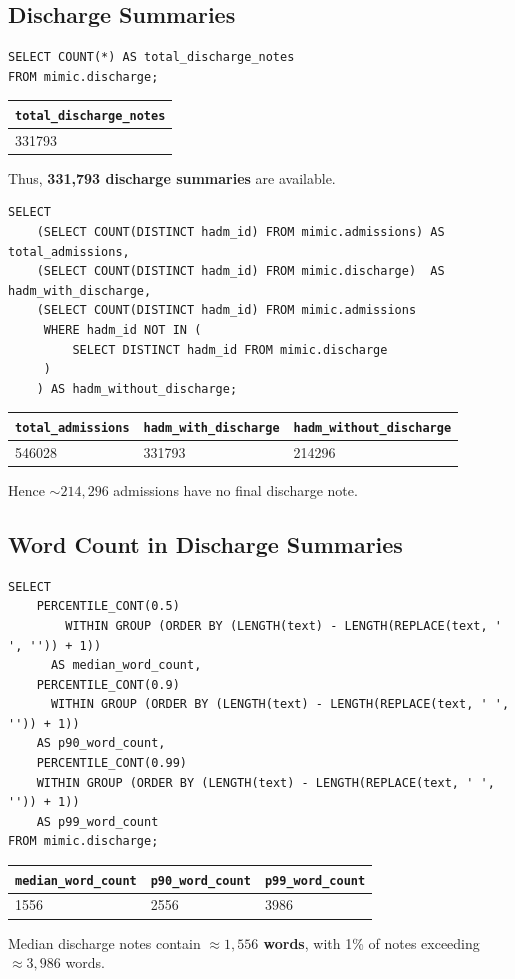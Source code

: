 \documentclass[12pt,a4paper]{report}
\begin{document}
\subsection{Discharge Summaries}
\begin{verbatim}
SELECT COUNT(*) AS total_discharge_notes
FROM mimic.discharge;
\end{verbatim}
\begin{center}
\begin{tabular}{l}
\hline
\texttt{total\_discharge\_notes} \\
\hline
331793 \\
\hline
\end{tabular}
\end{center}
Thus, \textbf{331,793 discharge summaries} are available.

\begin{verbatim}
SELECT
    (SELECT COUNT(DISTINCT hadm_id) FROM mimic.admissions) AS total_admissions,
    (SELECT COUNT(DISTINCT hadm_id) FROM mimic.discharge)  AS hadm_with_discharge,
    (SELECT COUNT(DISTINCT hadm_id) FROM mimic.admissions
     WHERE hadm_id NOT IN (
         SELECT DISTINCT hadm_id FROM mimic.discharge
     )
    ) AS hadm_without_discharge;
\end{verbatim}
\begin{center}
\begin{tabular}{l|l|l}
\hline
\texttt{total\_admissions} & \texttt{hadm\_with\_discharge} & \texttt{hadm\_without\_discharge} \\
\hline
546028 & 331793 & 214296 \\
\hline
\end{tabular}
\end{center}
Hence \(\sim214{,}296\) admissions have no final discharge note.

\subsection{Word Count in Discharge Summaries}
\begin{verbatim}
SELECT
    PERCENTILE_CONT(0.5)
        WITHIN GROUP (ORDER BY (LENGTH(text) - LENGTH(REPLACE(text, ' ', '')) + 1))
      AS median_word_count,
    PERCENTILE_CONT(0.9)
      WITHIN GROUP (ORDER BY (LENGTH(text) - LENGTH(REPLACE(text, ' ', '')) + 1))
    AS p90_word_count,
    PERCENTILE_CONT(0.99)
    WITHIN GROUP (ORDER BY (LENGTH(text) - LENGTH(REPLACE(text, ' ', '')) + 1))
    AS p99_word_count
FROM mimic.discharge;
\end{verbatim}
\begin{center}
\begin{tabular}{l|l|l}
\hline
\texttt{median\_word\_count} & \texttt{p90\_word\_count} & \texttt{p99\_word\_count} \\
\hline
1556 & 2556 & 3986 \\
\hline
\end{tabular}
\end{center}
Median discharge notes contain \textbf{\(\approx1{,}556\) words}, with 1\% of notes exceeding \(\approx3{,}986\) words.
\end{document}
